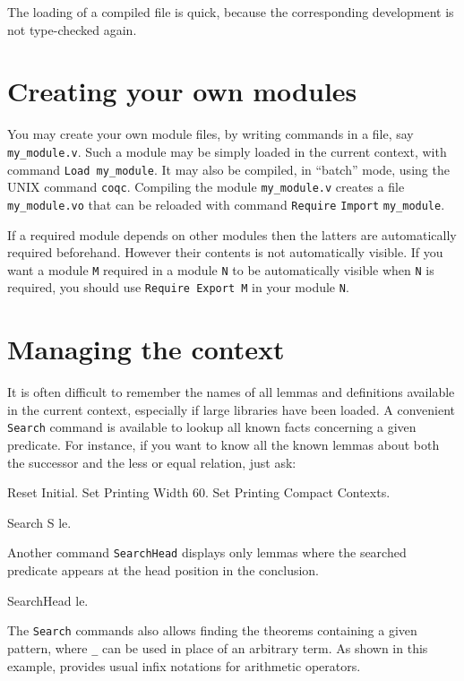 \documentclass[11pt,a4paper]{book}
\begin{document}
The loading of a compiled file is quick, because the corresponding
development is not type-checked again. 

\section{Creating your own modules}

You may create your own module files, by writing {\Coq} commands in a file,
say \verb:my_module.v:. Such a module may be simply loaded in the current
context, with command \verb:Load my_module:. It may also be compiled,
in ``batch'' mode, using the UNIX command
\verb:coqc:. Compiling the module \verb:my_module.v: creates a 
file \verb:my_module.vo:{} that can be reloaded with command
\verb:Require: \verb:Import: \verb:my_module:. 

If a required module depends on other modules then the latters are
automatically required beforehand. However their contents is not
automatically visible.  If you want a module \verb=M= required in a
module \verb=N= to be automatically visible when \verb=N= is required,
you should use \verb:Require Export M: in your module \verb:N:.

\section{Managing the context}

It is often difficult to remember the names of all lemmas and
definitions available in the current context, especially if large
libraries have been loaded. A convenient \verb:Search: command
is available to lookup all known facts 
concerning a given predicate. For instance, if you want to know all the
known lemmas about both the successor and the less or equal relation, just ask:
\begin{coq_eval}
Reset Initial.
Set Printing Width 60.
Set Printing Compact Contexts.
\end{coq_eval}
\begin{coq_example}
Search S le.
\end{coq_example}
Another command \verb:SearchHead: displays only lemmas where the searched
predicate appears at the head position in the conclusion.
\begin{coq_example}
SearchHead le.
\end{coq_example}

The \verb:Search: commands also allows finding the theorems
containing a given pattern, where \verb:_: can be used in
place of an arbitrary term. As shown in this example, \Coq{}
provides usual infix notations for arithmetic operators.
\end{document}
